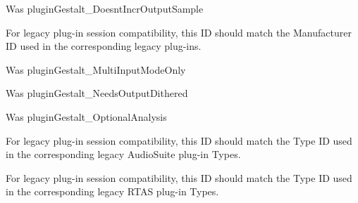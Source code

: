 \begin{DoxyRefList}
%
 Was plugin\+Gestalt\+\_\+\+Doesnt\+Incr\+Output\+Sample  
\item[Member \mbox{\hyperlink{a00662_a13e384f22825afd3db6d68395b79ce0da996465cca29a2a15291d1c788ac5728c}{A\+A\+X\+\_\+e\+Property\+\_\+\+Manufacturer\+ID}} ]\label{a00787__porting_notes000041}%
%
 For legacy plug-\/in session compatibility, this ID should match the Manufacturer ID used in the corresponding legacy plug-\/ins.  
\item[Member \mbox{\hyperlink{a00662_a13e384f22825afd3db6d68395b79ce0daa15cf3edd899af4a98fa18fcdfdeb9d6}{A\+A\+X\+\_\+e\+Property\+\_\+\+Multi\+Input\+Mode\+Only}} ]\label{a00787__porting_notes000054}%
%
 Was plugin\+Gestalt\+\_\+\+Multi\+Input\+Mode\+Only  
\item[Member \mbox{\hyperlink{a00662_a13e384f22825afd3db6d68395b79ce0da38a26f7d914d391cef1f71acfb98a2ec}{A\+A\+X\+\_\+e\+Property\+\_\+\+Needs\+Output\+Dithered}} ]\label{a00787__porting_notes000057}%
%
 Was plugin\+Gestalt\+\_\+\+Needs\+Output\+Dithered  
\item[Member \mbox{\hyperlink{a00662_a13e384f22825afd3db6d68395b79ce0da5a2bacb421fc36f890a121f01a9e72ba}{A\+A\+X\+\_\+e\+Property\+\_\+\+Optional\+Analysis}} ]\label{a00787__porting_notes000049}%
%
 Was plugin\+Gestalt\+\_\+\+Optional\+Analysis  
\item[Member \mbox{\hyperlink{a00662_a13e384f22825afd3db6d68395b79ce0dad3344696b8298a8b254add3d039ea927}{A\+A\+X\+\_\+e\+Property\+\_\+\+Plug\+In\+I\+D\+\_\+\+Audio\+Suite}} ]\label{a00787__porting_notes000044}%
%
 For legacy plug-\/in session compatibility, this ID should match the Type ID used in the corresponding legacy Audio\+Suite plug-\/in Types.  
\item[Member \mbox{\hyperlink{a00662_a13e384f22825afd3db6d68395b79ce0da89ca3dd6e96895cda14976c1b1ceb826}{A\+A\+X\+\_\+e\+Property\+\_\+\+Plug\+In\+I\+D\+\_\+\+Native}} ]\label{a00787__porting_notes000043}%
%
 For legacy plug-\/in session compatibility, this ID should match the Type ID used in the corresponding legacy R\+T\+AS plug-\/in Types.  
\item[Member \mbox{\hyperlink{a00662_a13e384f22825afd3db6d68395b79ce0da75f174df4efbeca86eaada126c1d9214}{A\+A\+X\+\_\+e\+Property\+\_\+\+Plug\+In\+I\+D\+\_\+\+TI}} ]\label{a00787__porting_notes000045}%

\end{DoxyRefList}
